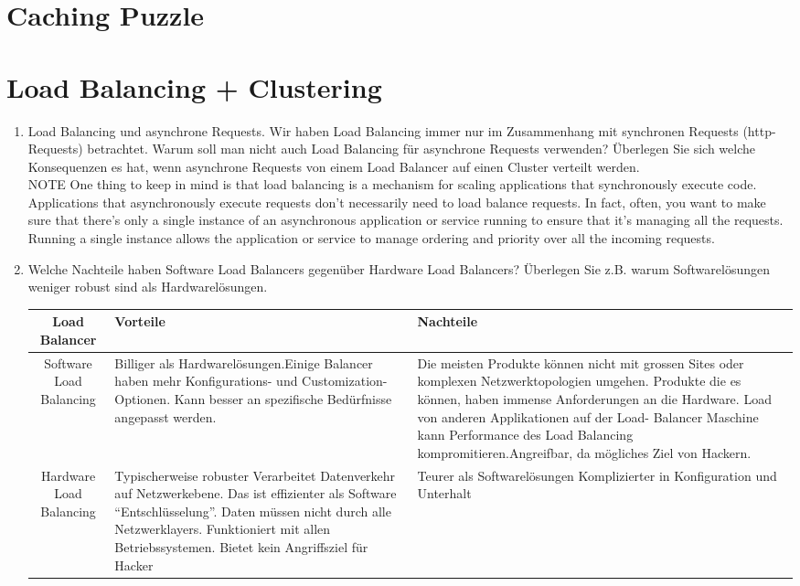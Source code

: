 \documentclass[a4paper,10pt]{scrreprt}
\begin{document}
\chapter{Caching Puzzle} %
\label{cha:caching_puzzle}

\chapter{Load Balancing + Clustering} %
\label{cha:load_balancing}
\begin{enumerate}
	\item Load Balancing und asynchrone Requests.
Wir haben Load Balancing immer nur im Zusammenhang mit synchronen Requests (http-Requests)
betrachtet. Warum soll man nicht auch Load Balancing für asynchrone Requests verwenden?
Überlegen Sie sich welche Konsequenzen es hat, wenn asynchrone Requests von einem Load
Balancer auf einen Cluster verteilt werden. \\

NOTE One thing to keep in mind is that load balancing is a mechanism for scaling applications
that synchronously execute code. Applications that asynchronously execute requests don’t
necessarily need to load balance requests. In fact, often, you want to make sure that there’s only
a single instance of an asynchronous application or service running to ensure that it’s managing
all the requests. Running a single instance allows the application or service to manage ordering
and priority over all the incoming requests.


\item Welche Nachteile haben Software Load Balancers gegenüber Hardware Load Balancers?
Überlegen Sie z.B. warum Softwarelösungen weniger robust sind als Hardwarelösungen.

\begin{tabular}{|c|p{5cm}|p{5cm}|}
\hline
Load Balancer & Vorteile & Nachteile \\ \hline
Software Load Balancing & Billiger als Hardwarelösungen.Einige Balancer haben mehr
Konfigurations- und
Customization-Optionen. Kann
besser an spezifische
Bedürfnisse angepasst
werden. & Die meisten Produkte
können nicht mit grossen
Sites oder komplexen
Netzwerktopologien
umgehen. Produkte die es können,
haben immense
Anforderungen an die
Hardware. Load von anderen
Applikationen auf der Load-
Balancer Maschine kann
Performance des Load
Balancing kompromitieren.Angreifbar, da mögliches
Ziel von Hackern. \\ \hline
Hardware Load Balancing & Typischerweise robuster
Verarbeitet Datenverkehr auf
Netzwerkebene. Das ist
effizienter als Software
“Entschlüsselung”. Daten
müssen nicht durch alle
Netzwerklayers.
Funktioniert mit allen
Betriebssystemen.
Bietet kein Angriffsziel für
Hacker & Teurer als
Softwarelösungen
 Komplizierter in
Konfiguration und Unterhalt \\ \hline
\end{tabular}


\end{enumerate}
\end{document}
